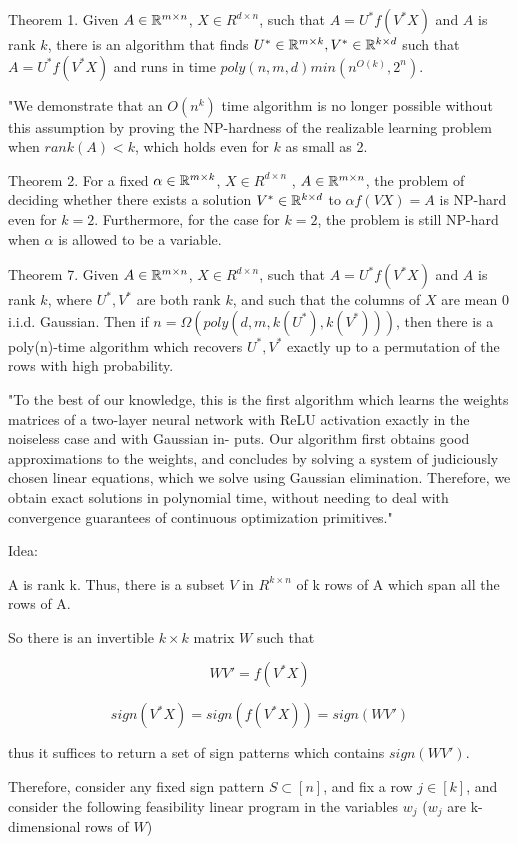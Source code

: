 \documentclass[english]{article}
\begin{document}
Theorem 1. Given $A \in \mathbb{R}^{m\times n}$, $X \in R^{d\times n}$, such that $A = U^* f(V^* X)$ and $A$ is rank $k$, there
is an algorithm that finds $U^* \in \mathbb{R}^{m\times k} ,V^* \in \mathbb{R}^{k\times d}$ such that $A = U^* f(V^* X)$ and runs in time $
poly(n,m,d) min(n^{O(k)} ,2^n)$.

"We demonstrate that an $O(n^k)$ time algorithm is no longer
possible without this assumption by proving the NP-hardness of the realizable learning problem when $rank(A) < k$, which holds even for $k$ as small as 2. 


Theorem 2. For a fixed $\alpha \in \mathbb{R}^{m\times k}$, $X \in R^{d\times n}$ , $A \in \mathbb{R}^{m\times n}$, the problem of deciding whether there
exists a solution $V^* \in \mathbb{R}^{k\times d}$ to $\alpha f(VX) = A$ is NP-hard even for $k = 2$. Furthermore, for the case
for $k = 2$, the problem is still NP-hard when $\alpha$ is allowed to be a variable.

Theorem 7. Given $A \in \mathbb{R}^{m\times n}$, $X \in R^{d\times n}$, such that $A = U^* f(V^* X)$ and $A$ is rank $k$, where $U^*,V^*$ are both rank $k$, and such
that the columns of $X$ are mean 0 i.i.d. Gaussian. Then if $n = \Omega(poly(d,m,k(U^*),k(V^*)))$,
then there is a poly(n)-time algorithm which recovers $U^*,V^*$ exactly up to a permutation of the
rows with high probability.

"To the best of our knowledge, this is the first algorithm which learns the weights matrices of a
two-layer neural network with ReLU activation exactly in the noiseless case and with Gaussian in-
puts. Our algorithm first obtains good approximations to the weights, and concludes by
solving a system of judiciously chosen linear equations, which we solve using Gaussian elimination.
Therefore, we obtain exact solutions in polynomial time, without needing to deal with convergence
guarantees of continuous optimization primitives."


Idea:


A is rank k. Thus, there is a subset $V$ in $R^{k\times n}$ of k rows of A which span all the rows of A.

So there is an invertible $k\times k$ matrix $W$ such that 

$$WV' = f(V^*X)$$

$$ sign(V^*X) = sign(f(V^*X)) = sign(WV')$$

thus it suffices to return a set of sign patterns which contains $sign(WV')$.

Therefore, consider any fixed sign pattern $S \subset [n]$, and fix a row $j \in [k]$, and consider the following
feasibility linear program in the variables $w_j$ ($w_j$ are k-dimensional rows of $W$)
\end{document}
